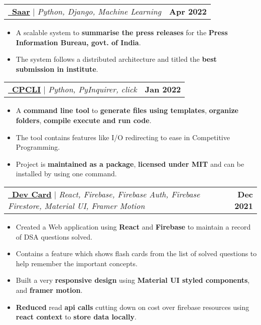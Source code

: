 \documentclass[letterpaper,11pt]{article}
\makeatletter
\newcommand{\resumeItem}[1]{
  \item\small{
    {#1 \vspace{-2pt}}
  }
}
\newcommand{\resumeProjectHeading}[2]{
    \item
    \begin{tabular*}{1.001\textwidth}{l@{\extracolsep{\fill}}r}
      \small#1 & \textbf{\small #2}\\
    \end{tabular*}\vspace{-7pt}
}
\newcommand{\resumeItemListStart}{\begin{itemize}}
\newcommand{\resumeItemListEnd}{\end{itemize}\vspace{-5pt}}
\makeatother
\begin{document}
      \vspace{-13pt}
        \resumeProjectHeading
          {\href{https://github.com/saar-official}{\raisebox{0.0\height}\faLink\ {\textbf{Saar}}} $|$ \emph{Python, Django, Machine Learning}}{Apr 2022}
          \resumeItemListStart
            \resumeItem{A scalable system to \textbf{summarise the press releases} for the  \textbf{Press Information Bureau, govt. of India}.}
            \resumeItem{The system follows a distributed architecture and titled the \textbf{best submission in institute}.}
          \resumeItemListEnd
          \vspace{-13pt}
      
      \resumeProjectHeading
          {\href{https://github.com/EricLiclair/CPCLI}{\raisebox{0.0\height}\faLink\ {\textbf{CPCLI}}} $|$ \emph{Python, PyInquirer, click}}{Jan 2022}
          \resumeItemListStart
            \resumeItem{A \textbf{command line tool} to \textbf{generate files using templates}, \textbf{organize folders}, \textbf{compile execute and run code}.}
            \resumeItem{The tool contains features like I/O redirecting to ease in Competitive Programming.}
            \resumeItem{Project is \textbf{maintained as a package}, \textbf{licensed under MIT} and can be installed by using one command.}
          \resumeItemListEnd
          \vspace{-13pt}

      \resumeProjectHeading
          {\href{https://github.com/EricLiclair/dev_card}{\raisebox{0.0\height}\faLink\ {\textbf{Dev Card}}} $|$ \emph{React, Firebase, Firebase Auth, Firebase Firestore, Material UI, Framer Motion}}{Dec 2021}
          \resumeItemListStart
            \resumeItem{Created a Web application using \textbf{React} and \textbf{Firebase} to maintain a record of DSA questions solved.}
            \resumeItem{Contains a feature which shows flash cards from the list of solved questions to help remember the important concepts.}
            \resumeItem{Built a very \textbf{responsive design} using \textbf{Material UI styled components}, and \textbf{framer motion}.}
            \resumeItem{\textbf{Reduced} read \textbf{api calls} cutting down on cost over firebase resources using \textbf{react context} to \textbf{store data locally}.}
          \resumeItemListEnd
          \vspace{-13pt}

          \vspace{13pt}
\end{document}
